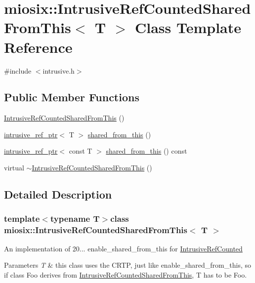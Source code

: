 \hypertarget{classmiosix_1_1_intrusive_ref_counted_shared_from_this}{\section{miosix\-:\-:Intrusive\-Ref\-Counted\-Shared\-From\-This$<$ T $>$ Class Template Reference}
\label{classmiosix_1_1_intrusive_ref_counted_shared_from_this}
}


{\ttfamily \#include $<$intrusive.\-h$>$}

\subsection*{Public Member Functions}
\begin{DoxyCompactItemize}
\item 
\hyperlink{classmiosix_1_1_intrusive_ref_counted_shared_from_this_a6aa28c15d73c150604000ca15fe52a0a}{Intrusive\-Ref\-Counted\-Shared\-From\-This} ()
\item 
\hyperlink{classmiosix_1_1intrusive__ref__ptr}{intrusive\-\_\-ref\-\_\-ptr}$<$ T $>$ \hyperlink{classmiosix_1_1_intrusive_ref_counted_shared_from_this_a5a446be7c84d36ea351cdd30d225bd83}{shared\-\_\-from\-\_\-this} ()
\item 
\hyperlink{classmiosix_1_1intrusive__ref__ptr}{intrusive\-\_\-ref\-\_\-ptr}$<$ const T $>$ \hyperlink{classmiosix_1_1_intrusive_ref_counted_shared_from_this_ad1f0cc4427314943dc38d2a73e3a6e6d}{shared\-\_\-from\-\_\-this} () const 
\item 
virtual \hyperlink{classmiosix_1_1_intrusive_ref_counted_shared_from_this_ad5405e69639b3f8bbc52676d26f4d4ce}{$\sim$\-Intrusive\-Ref\-Counted\-Shared\-From\-This} ()
\end{DoxyCompactItemize}


\subsection{Detailed Description}
\subsubsection*{template$<$typename T$>$class miosix\-::\-Intrusive\-Ref\-Counted\-Shared\-From\-This$<$ T $>$}

An implementation of 20... enable\-\_\-shared\-\_\-from\-\_\-this for \hyperlink{classmiosix_1_1_intrusive_ref_counted}{Intrusive\-Ref\-Counted} 
\begin{DoxyParams}{Parameters}
{\em T} & this class uses the C\-R\-T\-P, just like enable\-\_\-shared\-\_\-from\-\_\-this, so if class Foo derives from \hyperlink{classmiosix_1_1_intrusive_ref_counted_shared_from_this}{Intrusive\-Ref\-Counted\-Shared\-From\-This}, T has to be Foo. \\
\hline
\end{DoxyParams}


